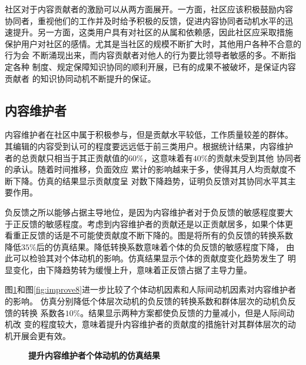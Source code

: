 社区对于内容贡献者的激励可以从两方面展开。一方面，社区应该积极鼓励内容
协同者，重视他们的工作并及时给予积极的反馈，促进内容协同者动机水平的迅
速提升。另一方面，这类用户具有对社区的从属和依赖感，因此社区应采取措施
保护用户对社区的感情。尤其是当社区的规模不断扩大时，其他用户各种不合意的行为会
不断涌现出来，而内容贡献者对他人的行为要比领导者敏感的多。不断指定各种
制度、规定保障知识协同的顺利开展，已有的成果不被破坏，是保证内容贡献者
的知识协同动机不断提升的保证。

\subsection{内容维护者}
内容维护者在社区中属于积极参与，但是贡献水平较低，工作质量较差的群体。
其编辑的内容受到认可的程度要远远低于前三类用户。根据统计结果，内容维护
者的总贡献只相当于其正贡献值的$60\%$，这意味着有$40\%$的贡献未受到其他
协同者的承认。随着时间推移，负面效应
累计的影响越来于多，使得其月人均贡献度不断下降。仿真的结果显示贡献度呈
对数下降趋势，证明负反馈对其协同水平其主要作用。

负反馈之所以能够占据主导地位，是因为内容维护者对于负反馈的敏感程度要大
于正反馈的敏感程度。考虑到内容维护者的贡献还是以正贡献居多，如果个体更
看重正反馈的话是不可能使贡献度不断下降的。图是将所有的负反馈的转换系数
降低$35\%$后的仿真结果。降低转换系数意味着个体的负反馈的敏感程度下降，
由此可以检验其对个体动机的影响。仿真结果显示个体的贡献度变化趋势发生了
明显变化，由下降趋势转为缓慢上升，意味着正反馈占据了主导力量。

图\ref{fig:improve7}和图\ref{fig:improve8}进一步比较了个体动机因素和人际间动机因素对内容维护者的影响。
仿真分别降低个体层次动机的负反馈的转换系数和群体层次的动机负反馈的转换
系数各$10\%$。结果显示两种方案都使负反馈的力量减小，但是人际间动机改
变的程度较大，意味着提升内容维护者的贡献度的措施针对其群体层次的动机开展会更有效。

\begin{figure}[!htb]
  \centering
  \caption{\small{\textbf{提升内容维护者个体动机的仿真结果}}}
  \label{fig:improve7}
\end{figure}

